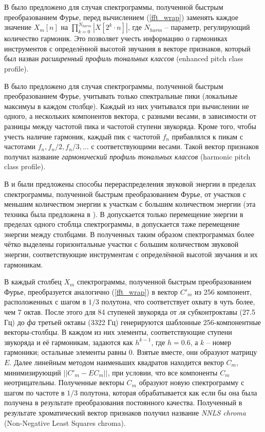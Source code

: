 В \cite{Lee2006} было предложено для случая спектрограммы, полученной быстрым
преобразованием Фурье, перед вычислением (\ref{fft_wrap}) заменять каждое
значение $X_m[n]$ на $\prod_{k=0}^{N_{harm}} |X[2^k \cdot n]|$, где $N_{harm}$
-- параметр, регулирующий количество гармоник. Это позволяет учесть информацию о
гармониках инструментов с определённой высотой звучания в векторе признаков,
который был назван \emph{расширенный профиль тональных классов} (enhanced pitch
class profile).

В \cite{Gomez2006} было предложено для случая спектрограммы, полученной быстрым
преобразованием Фурье, учитывать только спектральные пики (локальные максимуы в
каждом столбце). Каждый из них учитывался при вычислении не одного, а
нескольких компонентов вектора, с разными весами, в зависимости от разницы
между частотой пика и частотой ступени звукоряда. Кроме того, чтобы учесть
наличие гармоник, каждый пик с частотой $f_n$ прибавлялся к пикам с частотами
$f_n, f_n/2, f_n/3, \ldots$ с соответствующими весами. Такой вектор признаков
получил название \emph{гармонический профиль тональных классов} (harmonic
pitch class profile).

В \cite{Weller2009} и \cite{Khadkevich2011} были предложены способы
перераспределения звуковой энергии в пределах спектрограммы, полученной быстрым
преобразованием Фурье, от участков с меньшим количеством энергии к участкам с
большим количеством энергии (эта техника была предложена в \cite{Kodera1978}). В
\cite{Weller2009} допускается только перемещение энергии в пределах одного
стоблца спектрограммы, в \cite{Khadkevich2011} допускается таже перемещение
энергии между столбцами. В полученных таким образом спектрограммах более чётко
выделены горизонтальные участки с большим количеством звуковой энергии,
соответствующие инструментам с определённой высотой звучания и их гармоникам.

В \cite{Mauch2010} каждый столбец $X_m$ спектрограммы, полученной быстрым
преобразованием Фурье, преобразуется аналогично (\ref{fft_wrap}) в вектор $C'_m$
из 256 компонент, расположенных с шагом в $1/3$ полутона, что соответствует
охвату в чуть более, чем 7 октав. После этого для 84 ступеней звукоряда от
\emph{ля} субконтроктавы (27.5 Гц) до \emph{фа} третьей октавы (3322 Гц)
генерируются шаблонные 256-компонентные векторы-столбцы. В каждом из них
элементы, соответствующие ступени звукоряда и её гармоникам, задаются как
$h^{k-1}$, где $h=0.6$, а $k$ -- номер гармоники; остальные элементы равны 0.
Взятые вместе, они образуют матрицу $E$. Далее линейным методом наименьших
квадратов находится вектор $C_m$, минимизирующий $||C'_m - EC_m||$, при условии,
что все компоненты $C_m$ неотрицательны. Полученные векторы $C_m$ образуют новую
спектрограмму с шагом по частоте в $1/3$ полутона, которая обрабатывается как
если бы она была получена в результате преобразования постоянного качества.
Полученный в результате хроматический вектор признаков получил название
\emph{NNLS chroma} (Non-Negative Least Squares chroma).

